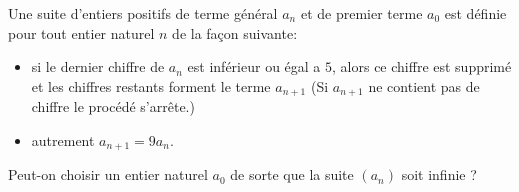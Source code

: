 \documentclass[varwidth]{standalone}
\begin{document}
    Une suite d'entiers positifs de terme g\'en\'eral $a_n$ et de premier terme $a_0$ est d\'efinie pour tout entier naturel $n$ de la fa\c con suivante:
    \begin{itemize}
        \item si le dernier chiffre de $a_n$ est inf\'erieur ou \'egal a $5$, alors ce chiffre est supprim\'e et les chiffres restants forment le terme $a_{n + 1}$ (Si $a_{n + 1}$ ne contient pas de chiffre le proc\'ed\'e s'arr\^ete.)
        \item autrement $a_{n + 1} = 9a_n$.
    \end{itemize}
    Peut-on choisir un entier naturel $a_0$ de sorte que la suite $(a_n)$ soit infinie ?
\end{document}

